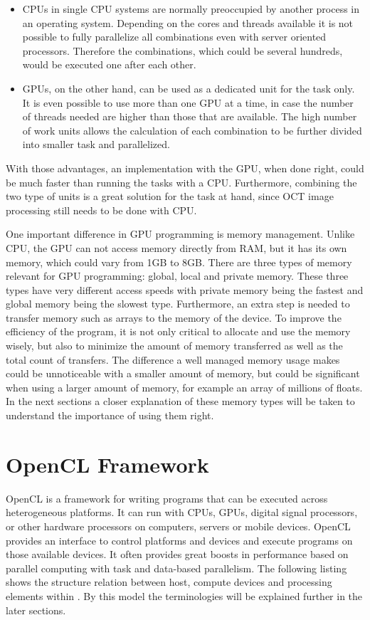\begin{itemize}
	\item CPUs in single CPU systems are normally preoccupied by another process in an operating system. Depending on the cores and threads available it is not possible to fully parallelize all combinations even with server oriented processors. Therefore the combinations, which could be several hundreds, would be executed one after each other.

	\item GPUs, on the other hand, can be used as a dedicated unit for the task only. It is even possible to use more than one GPU at a time, in case the number of threads needed are higher than those that are available. The high number of work units allows the calculation of each combination to be further divided into smaller task and parallelized.
\end{itemize} 

With those advantages, an implementation with the GPU, when done right, could be much faster than running the tasks with a CPU. Furthermore, combining the two type of units is a great solution for the task at hand, since OCT image processing still needs to be done with CPU. 

One important difference in GPU programming is memory management. Unlike CPU, the GPU can not access memory directly from RAM, but it has its own memory, which could vary from 1GB to 8GB. There are three types of memory relevant for GPU programming: global, local and private memory. These three types have very different access speeds with private memory being the fastest and global memory being the slowest type. Furthermore, an extra step is needed to transfer memory such as arrays to the memory of the device. To improve the efficiency of the program, it is not only critical to allocate and use the memory wisely, but also to minimize the amount of memory transferred as well as the total count of transfers. The difference a well managed memory usage makes could be unnoticeable with a smaller amount of memory, but could be significant when using a larger amount of memory, for example an array of millions of floats. In the next sections a closer explanation of these memory types will be taken to understand the importance of using them right.
\pagebreak
\section{OpenCL Framework}
OpenCL is a framework for writing programs that can be executed across heterogeneous platforms. It can run with CPUs, GPUs, digital signal processors, or other hardware processors on computers, servers or mobile devices. OpenCL provides an interface to control platforms and devices and execute programs on those available devices. It often provides great boosts in performance based on parallel computing with task and data-based parallelism. The following listing shows the structure relation between host, compute devices and processing elements within \cite{opencl}. By this model the terminologies will be explained further in the later sections.
 

